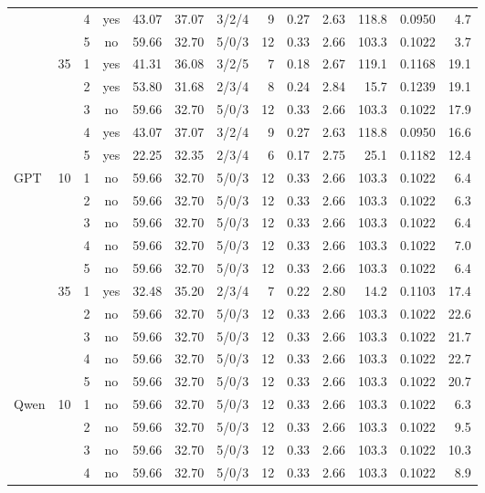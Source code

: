 \begin{table}[h]
\begin{tabular}{lrrcrrcrrrrrr}
 &  & 4 & yes & 43.07 & 37.07 & 3/2/4 & 9 & 0.27 & 2.63 & 118.8 & 0.0950 & 4.7 \\
 &  & 5 & no & 59.66 & 32.70 & 5/0/3 & 12 & 0.33 & 2.66 & 103.3 & 0.1022 & 3.7 \\
\cmidrule(lr){2-13}
 & 35 & 1 & yes & 41.31 & 36.08 & 3/2/5 & 7 & 0.18 & 2.67 & 119.1 & 0.1168 & 19.1 \\
 &  & 2 & yes & 53.80 & 31.68 & 2/3/4 & 8 & 0.24 & 2.84 & 15.7 & 0.1239 & 19.1 \\
 &  & 3 & no & 59.66 & 32.70 & 5/0/3 & 12 & 0.33 & 2.66 & 103.3 & 0.1022 & 17.9 \\
 &  & 4 & yes & 43.07 & 37.07 & 3/2/4 & 9 & 0.27 & 2.63 & 118.8 & 0.0950 & 16.6 \\
 &  & 5 & yes & 22.25 & 32.35 & 2/3/4 & 6 & 0.17 & 2.75 & 25.1 & 0.1182 & 12.4 \\
\midrule
GPT & 10 & 1 & no & 59.66 & 32.70 & 5/0/3 & 12 & 0.33 & 2.66 & 103.3 & 0.1022 & 6.4 \\
 &  & 2 & no & 59.66 & 32.70 & 5/0/3 & 12 & 0.33 & 2.66 & 103.3 & 0.1022 & 6.3 \\
 &  & 3 & no & 59.66 & 32.70 & 5/0/3 & 12 & 0.33 & 2.66 & 103.3 & 0.1022 & 6.4 \\
 &  & 4 & no & 59.66 & 32.70 & 5/0/3 & 12 & 0.33 & 2.66 & 103.3 & 0.1022 & 7.0 \\
 &  & 5 & no & 59.66 & 32.70 & 5/0/3 & 12 & 0.33 & 2.66 & 103.3 & 0.1022 & 6.4 \\
\cmidrule(lr){2-13}
 & 35 & 1 & yes & 32.48 & 35.20 & 2/3/4 & 7 & 0.22 & 2.80 & 14.2 & 0.1103 & 17.4 \\
 &  & 2 & no & 59.66 & 32.70 & 5/0/3 & 12 & 0.33 & 2.66 & 103.3 & 0.1022 & 22.6 \\
 &  & 3 & no & 59.66 & 32.70 & 5/0/3 & 12 & 0.33 & 2.66 & 103.3 & 0.1022 & 21.7 \\
 &  & 4 & no & 59.66 & 32.70 & 5/0/3 & 12 & 0.33 & 2.66 & 103.3 & 0.1022 & 22.7 \\
 &  & 5 & no & 59.66 & 32.70 & 5/0/3 & 12 & 0.33 & 2.66 & 103.3 & 0.1022 & 20.7 \\
\midrule
Qwen & 10 & 1 & no & 59.66 & 32.70 & 5/0/3 & 12 & 0.33 & 2.66 & 103.3 & 0.1022 & 6.3 \\
 &  & 2 & no & 59.66 & 32.70 & 5/0/3 & 12 & 0.33 & 2.66 & 103.3 & 0.1022 & 9.5 \\
 &  & 3 & no & 59.66 & 32.70 & 5/0/3 & 12 & 0.33 & 2.66 & 103.3 & 0.1022 & 10.3 \\
 &  & 4 & no & 59.66 & 32.70 & 5/0/3 & 12 & 0.33 & 2.66 & 103.3 & 0.1022 & 8.9 \\

\end{tabular}
\end{table}
